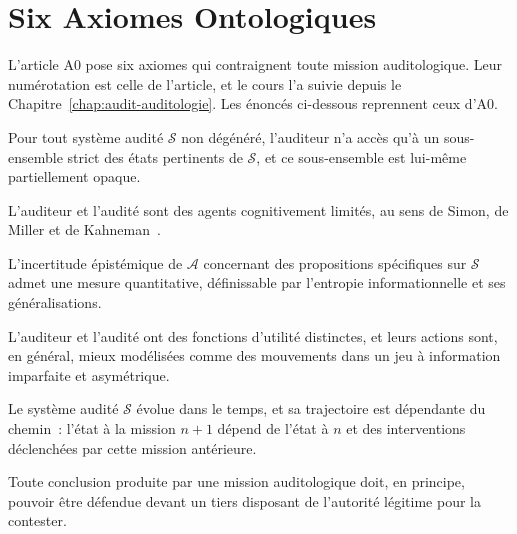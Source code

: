 \section{Six Axiomes Ontologiques}
\label{sec:c30-axiomes}

L'article A0 pose six axiomes qui contraignent toute mission
auditologique. Leur numérotation est celle de l'article, et le cours l'a
suivie depuis le Chapitre~\ref{chap:audit-auditologie}. Les énoncés
ci-dessous reprennent ceux d'A0.

\begin{axiome}
Pour tout système audité $\mathcal{S}$ non dégénéré, l'auditeur n'a accès
qu'à un sous-ensemble strict des états pertinents de $\mathcal{S}$, et ce
sous-ensemble est lui-même partiellement opaque.
\end{axiome}

\begin{axiome}
L'auditeur et l'audité sont des agents cognitivement limités, au sens de
Simon, de Miller et de Kahneman~\cite{simon1957,miller1956,kahneman2011}.
\end{axiome}

\begin{axiome}
L'incertitude épistémique de $\mathcal{A}$ concernant des propositions
spécifiques sur $\mathcal{S}$ admet une mesure quantitative, définissable
par l'entropie informationnelle et ses généralisations.
\end{axiome}

\begin{axiome}
L'auditeur et l'audité ont des fonctions d'utilité distinctes, et leurs
actions sont, en général, mieux modélisées comme des mouvements dans un jeu
à information imparfaite et asymétrique.
\end{axiome}

\begin{axiome}
Le système audité $\mathcal{S}$ évolue dans le temps, et sa trajectoire est
dépendante du chemin~: l'état à la mission $n+1$ dépend de l'état à $n$ et
des interventions déclenchées par cette mission antérieure.
\end{axiome}

\begin{axiome}[Opposabilité]
Toute conclusion produite par une mission auditologique doit, en principe,
pouvoir être défendue devant un tiers disposant de l'autorité légitime pour
la contester.
\end{axiome}

